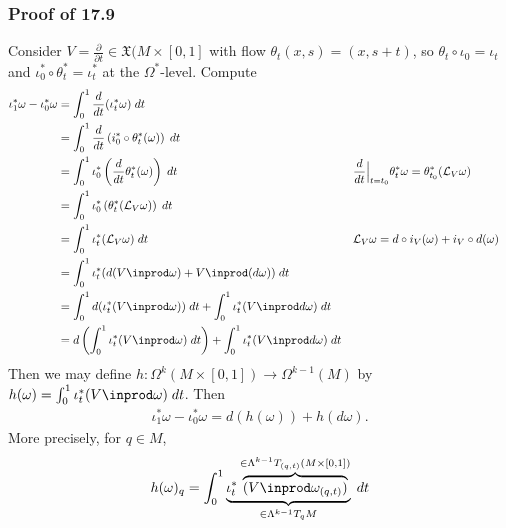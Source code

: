 \documentclass[11pt]{article}
\begin{document}
\subsubsection*{Proof of 17.9}
\label{sec:org6267518}
Consider \(V=\frac{\partial}{\partial t}\in\mathfrak{X}(M\times[0,1]\) with flow \(\theta_{t}(x,s)=(x,s+t)\), so \(\theta_{t}\circ\iota_{0}=\iota_{t}\) and \(\iota^{*}_{0}\circ\theta^{*}_{t}=\iota^{*}_{t}\) at the \(\Omega^{*}\)-level. Compute\\
\begin{align*}
  \iota^{*}_{1}\omega-\iota^{*}_{0}\omega
  &=\int_{0}^{1}\frac{d}{dt}(\iota_{t}^{*}\omega)\;dt \\
  &=\int_{0}^{1}\frac{d}{dt}\left( i^{*}_{0}\circ\theta^{*}_{t}(\omega) \right)\;dt \\
  &=\int_{0}^{1}\iota_{0}^{*}\left( \frac{d}{dt}\theta^{*}_{t}(\omega) \right)\;dt & & \frac{d}{dt}\Big|_{t=t_{0}}\theta^{*}_{t}\omega=\theta_{t_{0}}^{*}(\mathcal{L}_{V}\omega) \\
  &=\int_{0}^{1}\iota_{0}^{*}\left( \theta^{*}_{t}(\mathcal{L}_{V}\omega) \right)\;dt \\
  &=\int_{0}^{1}\iota_{t}^{*}(\mathcal{L}_{V}\omega)\;dt & & \mathcal{L}_{V}\omega=d\circ i_{V}(\omega)+i_{V}\circ d(\omega) \\
  &=\int_{0}^{1}\iota_{t}^{*}(d(V\inprod\omega)+V\inprod(d\omega))\;dt \\
  &=\int_{0}^{1}d(\iota_{t}^{*}(V\inprod\omega))\;dt+\int_{0}^{1}\iota_{t}^{*}(V\inprod d\omega)\;dt \\
  &=d\left( \int_{0}^{1}\iota_{t}^{*}(V\inprod\omega)\;dt \right)+\int_{0}^{1}\iota_{t}^{*}(V\inprod d\omega)\;dt
\end{align*}
Then we may define \(h:\Omega^{k}(M\times[0,1])\to\Omega^{k-1}(M)\) by \(h(\omega)=\int_{0}^{1}\iota_{t}^{*}(V\inprod\omega)\;dt\). Then\\
\begin{align*}
  \iota_{1}^{*}\omega-\iota_{0}^{*}\omega
  =d(h(\omega))+h(d\omega).
\end{align*}
More precisely, for \(q\in M\),\\
\begin{align*}
  h(\omega)_{q}
  =\int_{0}^{1}\underbrace{\iota_{t}^{*}\overbrace{(V\inprod\omega_{(q,t)})}^{\in\Lambda^{k-1}T_{(q,t)}(M\times[0,1])}}_{\in\Lambda^{k-1}T_{q}M}\;dt
\end{align*}
\end{document}

